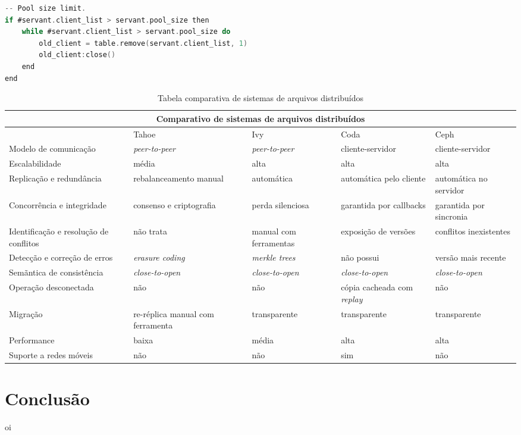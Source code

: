 \documentclass[11pt]{article}
\begin{document}
\begin{lstlisting}[label={melhorias},language=C,caption=Connection Pool
em C \textit{PPH} em $O(n^2)$ com \textit{array}]
-- Pool size limit.
if #servant.client_list > servant.pool_size then
    while #servant.client_list > servant.pool_size do
        old_client = table.remove(servant.client_list, 1)
        old_client:close()
    end
end
\end{lstlisting}

\renewcommand{\arraystretch}{2}
\begin{table}
\begin{center}
{\footnotesize \begin{tabular}{p{2.5cm} p{2.5cm} p{2.5cm} p{2.5cm} p{2.5cm}}
\hline
\multicolumn{5}{c}{Comparativo de sistemas de arquivos distribuídos} \\ \hline
~ & Tahoe & Ivy & Coda & Ceph \\ \hline
Modelo de comunicação & \textit{peer-to-peer} & \textit{peer-to-peer} & cliente-servidor & cliente-servidor \\
Escalabilidade & média & alta & alta & alta \\
Replicação e redundância & rebalanceamento manual & automática & automática pelo cliente & automática no servidor \\
Concorrência e integridade & consenso e criptografia & perda silenciosa & garantida por callbacks & garantida por sincronia \\
Identificação e resolução de conflitos & não trata & manual com ferramentas & exposição de versões & conflitos inexistentes \\
Detecção e correção de erros & \textit{erasure coding} & \textit{merkle trees} & não possui & versão mais recente \\
Semãntica de consistência & \textit{close-to-open} & \textit{close-to-open} & \textit{close-to-open} & \textit{close-to-open} \\
Operação desconectada & não & não & cópia cacheada com \textit{replay} & não \\ 
Migração & re-réplica manual com ferramenta & transparente & transparente & transparente \\
Performance & baixa & média & alta & alta \\
Suporte a redes móveis & não & não & sim & não \\
\hline
\end{tabular}}
\caption{Tabela comparativa de sistemas de arquivos distribuídos}
\label{tab:compare}
\end{center}
\end{table}

\section{Conclusão}\label{sec:conclusion}

oi



\end{document}
